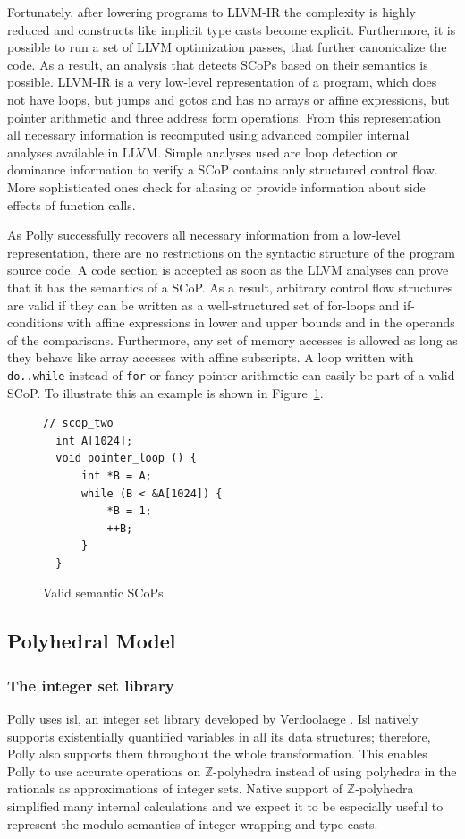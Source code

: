 Fortunately, after lowering programs to LLVM-IR the complexity is highly
reduced and constructs like implicit type casts become explicit. Furthermore,
it is possible to run a set of LLVM optimization passes, that further
canonicalize the code.  As a result, an
analysis that detects SCoPs based on their semantics is possible.  LLVM-IR is a
very low-level representation of a program, which does not have loops, but
jumps and gotos and has no arrays or affine expressions, but pointer arithmetic
and three address form operations. From this representation all necessary
information is recomputed using advanced compiler internal analyses available
in LLVM. Simple analyses used are loop detection or dominance information to
verify a SCoP contains only structured control flow. More sophisticated ones
check for aliasing or provide information about side effects of
function calls. 

As Polly successfully recovers all necessary information from a low-level
representation, there are no restrictions on the syntactic structure of the
program source code. A code section is accepted as soon as the LLVM analyses
can prove that it has the semantics of a SCoP. As a result, 
arbitrary control
flow structures are valid if they can be written as a well-structured set
of for-loops and if-conditions with affine expressions in lower and upper
bounds and in the operands of the comparisons. Furthermore, any set of
memory accesses is allowed as long as they behave like array accesses with affine subscripts.
A loop written
with \texttt{do..while} instead of \texttt{for} or fancy pointer arithmetic can easily be part of a valid SCoP.
To illustrate this an example is shown in Figure~\ref{semscop}.

\begin{figure}
\begin{verbatim}
// scop_two
  int A[1024];
  void pointer_loop () {
      int *B = A;
      while (B < &A[1024]) {
          *B = 1;
          ++B;
      }
  }
\end{verbatim}
\caption{Valid semantic SCoPs}
\label{semscop}
\end{figure}

\subsection{Polyhedral Model}

\subsubsection{The integer set library} Polly uses isl, an integer set library
developed by Verdoolaege \cite{Verdoolaege10}. Isl natively supports
existentially quantified variables in all its data structures; therefore, Polly
also supports them throughout the whole transformation. This enables Polly to
use accurate operations on $\mathbb{Z}$-polyhedra instead of using polyhedra
in the rationals as approximations of integer sets.
Native support of $\mathbb{Z}$-polyhedra
simplified many internal calculations and we
expect it to be especially useful to represent the modulo semantics of integer
wrapping and type casts.


